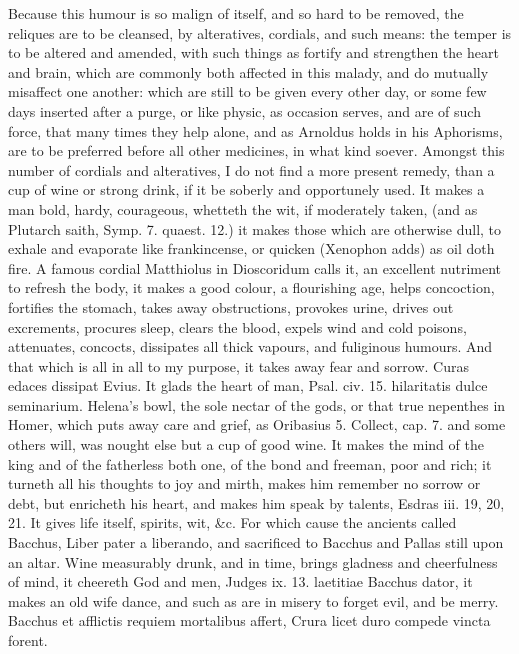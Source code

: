 Because this humour is so malign of itself, and so hard to be removed,
the reliques are to be cleansed, by alteratives, cordials, and such
means: the temper is to be altered and amended, with such things as
fortify and strengthen the heart and brain, which are commonly
both affected in this malady, and do mutually misaffect one another:
which are still to be given every other day, or some few days inserted
after a purge, or like physic, as occasion serves, and are of such
force, that many times they help alone, and as Arnoldus holds in
his Aphorisms, are to be preferred before all other medicines, in what
kind soever.
Amongst this number of cordials and alteratives, I do not find a more
present remedy, than a cup of wine or strong drink, if it be soberly
and opportunely used. It makes a man bold, hardy, courageous,
whetteth the wit, if moderately taken, (and as Plutarch
saith, Symp. 7. quaest. 12.) it makes those which are otherwise
dull, to exhale and evaporate like frankincense, or quicken (Xenophon
adds) as oil doth fire. A famous cordial Matthiolus in
Dioscoridum calls it, an excellent nutriment to refresh the body, it
makes a good colour, a flourishing age, helps concoction, fortifies the
stomach, takes away obstructions, provokes urine, drives out
excrements, procures sleep, clears the blood, expels wind and cold
poisons, attenuates, concocts, dissipates all thick vapours, and
fuliginous humours. And that which is all in all to my purpose, it
takes away fear and sorrow. Curas edaces dissipat Evius. It glads
the heart of man, Psal. civ. 15. hilaritatis dulce seminarium. Helena's
bowl, the sole nectar of the gods, or that true nepenthes in
Homer, which puts away care and grief, as Oribasius 5. Collect,
cap. 7. and some others will, was nought else but a cup of good wine.
It makes the mind of the king and of the fatherless both one, of the
bond and freeman, poor and rich; it turneth all his thoughts to joy and
mirth, makes him remember no sorrow or debt, but enricheth his heart,
and makes him speak by talents, Esdras iii. 19, 20, 21. It gives life
itself, spirits, wit, \&c. For which cause the ancients called Bacchus,
Liber pater a liberando, and sacrificed to Bacchus and Pallas
still upon an altar. Wine measurably drunk, and in time, brings
gladness and cheerfulness of mind, it cheereth God and men, Judges ix.
13. laetitiae Bacchus dator, it makes an old wife dance, and such as
are in misery to forget evil, and be merry.
Bacchus et afflictis requiem mortalibus affert,
Crura licet duro compede vincta forent.

